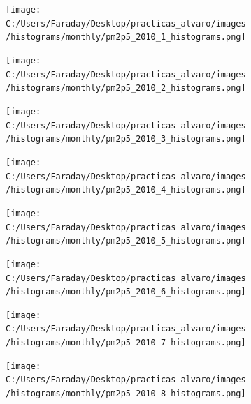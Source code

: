 \documentclass[12pt]{article}
\begin{document}
\newpage

\begin{figure}[H]
\centering
\begin{subfigure}[h]{0.45\textwidth}
\texttt{[image: C:/Users/Faraday/Desktop/practicas\_alvaro/images/histograms/monthly/pm2p5\_2010\_1\_histograms.png]}
\caption{}
\label{fig:hist-mon-4-1-2010}
\end{subfigure}
%
\begin{subfigure}[H]{0.45\textwidth}
\texttt{[image: C:/Users/Faraday/Desktop/practicas\_alvaro/images/histograms/monthly/pm2p5\_2010\_2\_histograms.png]}
\caption{}
\label{fig:hist-mon-4-2-2010}
\end{subfigure}
\caption{}
\end{figure}

\begin{figure}[H]
\centering
\begin{subfigure}[h]{0.45\textwidth}
\texttt{[image: C:/Users/Faraday/Desktop/practicas\_alvaro/images/histograms/monthly/pm2p5\_2010\_3\_histograms.png]}
\caption{}
\label{fig:hist-mon-4-3-2010}
\end{subfigure}
%
\begin{subfigure}[H]{0.45\textwidth}
\texttt{[image: C:/Users/Faraday/Desktop/practicas\_alvaro/images/histograms/monthly/pm2p5\_2010\_4\_histograms.png]}
\caption{}
\label{fig:hist-mon-4-4-2010}
\end{subfigure}
\caption{}
\end{figure}

\begin{figure}[H]
\centering
\begin{subfigure}[h]{0.45\textwidth}
\texttt{[image: C:/Users/Faraday/Desktop/practicas\_alvaro/images/histograms/monthly/pm2p5\_2010\_5\_histograms.png]}
\caption{}
\label{fig:hist-mon-4-5-2010}
\end{subfigure}
%
\begin{subfigure}[H]{0.45\textwidth}
\texttt{[image: C:/Users/Faraday/Desktop/practicas\_alvaro/images/histograms/monthly/pm2p5\_2010\_6\_histograms.png]}
\caption{}
\label{fig:hist-mon-4-6-2010}
\end{subfigure}
\caption{}
\end{figure}

\newpage

\begin{figure}[H]
\centering
\begin{subfigure}[h]{0.45\textwidth}
\texttt{[image: C:/Users/Faraday/Desktop/practicas\_alvaro/images/histograms/monthly/pm2p5\_2010\_7\_histograms.png]}
\caption{}
\label{fig:hist-mon-4-7-2010}
\end{subfigure}
%
\begin{subfigure}[H]{0.45\textwidth}
\texttt{[image: C:/Users/Faraday/Desktop/practicas\_alvaro/images/histograms/monthly/pm2p5\_2010\_8\_histograms.png]}
\caption{}
\label{fig:hist-mon-4-8-2010}
\end{subfigure}
\caption{}
\end{figure}
\end{document}
